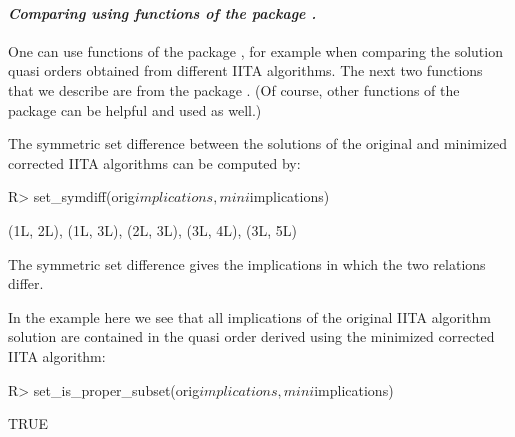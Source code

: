 \documentclass[nojss]{jss}
\begin{document}
\paragraph{\it Comparing using functions of the package .}
One can use functions of the package , for example when comparing the solution quasi orders obtained from different IITA algorithms. The next two functions that we describe
are from the package . (Of course, other functions of the package  
can be helpful and used as well.)

The symmetric set difference between the solutions of the original and minimized corrected IITA algorithms can be computed by:
\begin{Schunk}
\begin{Sinput}
R> set_symdiff(orig$implications, mini$implications)
\end{Sinput}
\begin{Soutput}
{(1L, 2L), (1L, 3L), (2L, 3L), (3L, 4L), (3L, 5L)}
\end{Soutput}
\end{Schunk}
The symmetric set difference gives the implications in which the two relations differ.

In the example here we see that all implications of the original IITA algorithm solution are contained 
in the quasi order derived using the minimized corrected IITA algorithm:
\begin{Schunk}
\begin{Sinput}
R> set_is_proper_subset(orig$implications, mini$implications)
\end{Sinput}
\begin{Soutput}
[1] TRUE
\end{Soutput}
\end{Schunk}
\end{document}
